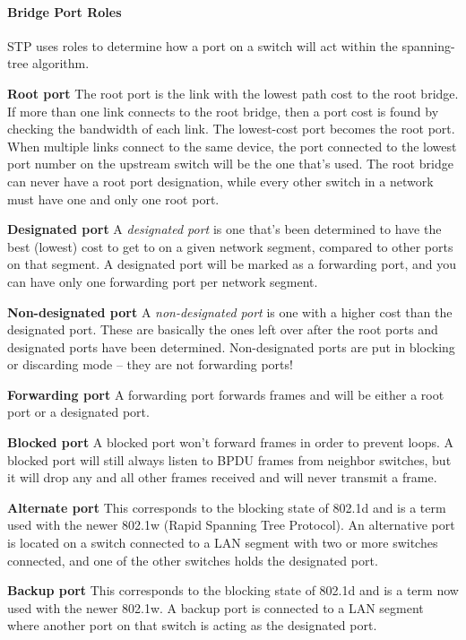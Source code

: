 \paragraph{Bridge Port Roles}

STP uses roles to determine how a port on a switch will act within the
spanning-tree algorithm.

\textbf{Root port} The root port is the link with the lowest path cost
to the root bridge. If more than one link connects to the root bridge,
then a port cost is found by checking the bandwidth of each link. The
lowest-cost port becomes the root port. When multiple links connect to
the same device, the port connected to the lowest port number on the
upstream switch will be the one that's used. The root bridge can never
have a root port designation, while every other switch in a network must
have one and only one root port.

\textbf{Designated port} A \emph{designated port} is one that's been
determined to have the best (lowest) cost to get to on a given network
segment, compared to other ports on that segment. A designated port will
be marked as a forwarding port, and you can have only one forwarding
port per network segment.

\textbf{Non-designated port} A \emph{non-designated port} is one with a
higher cost than the designated port. These are basically the ones left
over after the root ports and designated ports have
been determined.
Non-designated ports are put in blocking or discarding mode -- they are
not forwarding ports!

\textbf{Forwarding port} A forwarding port forwards frames and will be
either a root port or a designated port.

\textbf{Blocked port} A blocked port won't forward frames in order to
prevent loops. A blocked port will still always listen to BPDU frames
from neighbor switches, but it will drop any and all other frames
received and will never transmit a frame.

\textbf{Alternate port} This corresponds to the blocking state of 802.1d
and is a term used with the newer 802.1w (Rapid Spanning Tree Protocol).
An alternative port is located on a switch connected to a LAN segment
with two or more switches connected, and one of the other switches holds
the designated port.

\textbf{Backup port} This corresponds to the blocking state of 802.1d
and is a term now used with the newer 802.1w. A backup port is connected
to a LAN segment where another port on that switch is acting as the
designated port.

